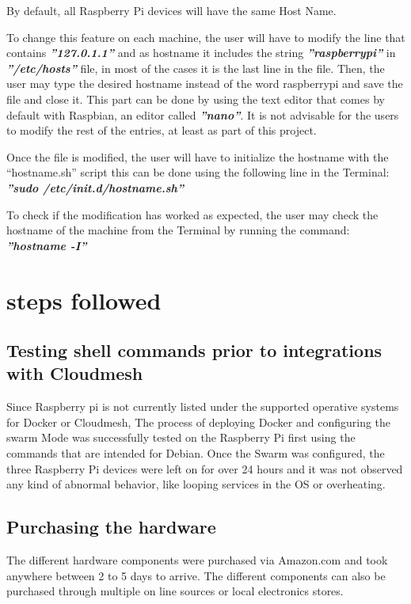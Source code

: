 \documentclass[sigconf]{acmart}
\begin{document}
	By default, all Raspberry Pi devices will have the same Host Name.
	
	To change this feature on each machine, the user will have to modify the line that contains \textbf{\textit{''127.0.1.1''}}  and as hostname it includes the string \textbf{\textit{''raspberrypi''}} in \textbf{\textit{''/etc/hosts''}} file, in most of the cases it is the last line in the file. Then, the user may type the desired hostname instead of the word raspberrypi and save the file and close it. This part can be done by using the text editor that comes by default with Raspbian, an editor called \textbf{\textit{''nano''}}.
	It is not advisable for the users to modify the rest of the entries, at least as part of this project.
	
	Once the file is modified, the user will have to initialize the hostname with the “hostname.sh” script this can be done using the following line in the Terminal: \textbf{\textit{''sudo /etc/init.d/hostname.sh''}}
	
	To check if the modification has worked  as expected, the user may check the hostname of the machine from the Terminal by running the command: \textbf{\textit{''hostname -I''}}
	
	\section{steps followed}
		
	\subsection{Testing shell commands prior to integrations with Cloudmesh}
	
	Since Raspberry pi is not currently listed under the supported operative systems for Docker or Cloudmesh, The process of deploying Docker and configuring the swarm Mode was successfully tested on the Raspberry Pi first using the commands that are intended for Debian. Once the Swarm was configured, the three Raspberry Pi devices were left on for over 24 hours and it was not observed any kind of abnormal behavior, like looping services in the OS or overheating.
		
	\subsection{Purchasing the hardware}
	
	The different hardware components were purchased via Amazon.com and took anywhere between 2 to 5 days to arrive. The different components can also be purchased through multiple on line sources or local electronics stores.
		
\end{document}
